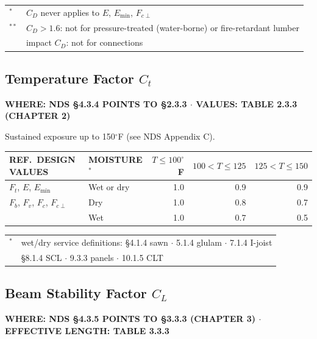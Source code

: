 \documentclass[10pt]{article}
\begin{document}
\smallskip
{\ttfamily\footnotesize
\begin{tabular}{@{}ll@{}}
$^{*}$  & $C_D$ never applies to $E$, $E_{\min}$, $F_{c\perp}$ \\
$^{**}$ & $C_D > 1.6$: not for pressure-treated (water-borne) or fire-retardant lumber \\
        & impact $C_D$: not for connections \\
\end{tabular}}

\subsection{Temperature Factor $C_t$}

{\ttfamily\footnotesize\bfseries WHERE: NDS \S 4.3.4 POINTS TO \S 2.3.3 $\cdot$ VALUES: TABLE 2.3.3 (CHAPTER 2)}

\medskip
Sustained exposure up to 150$^\circ$F (see NDS Appendix C).

\medskip
{\setlength{\arrayrulewidth}{0.5pt}\ttfamily\footnotesize
\begin{tabular}{@{}llrrr@{}}
\hline
{\scriptsize REF.\ DESIGN VALUES} & {\scriptsize MOISTURE$^{*}$} & {\scriptsize $T\le100^\circ$F} & {\scriptsize $100<T\le125$} & {\scriptsize $125<T\le150$} \\
\hline
$F_t$, $E$, $E_{\min}$ & Wet or dry & 1.0 & 0.9 & 0.9 \\
$F_b$, $F_v$, $F_c$, $F_{c\perp}$ & Dry & 1.0 & 0.8 & 0.7 \\
                                  & Wet & 1.0 & 0.7 & 0.5 \\
\hline
\end{tabular}}

\smallskip
{\ttfamily\footnotesize
\begin{tabular}{@{}ll@{}}
$^{*}$ & wet/dry service definitions: \S 4.1.4 sawn $\cdot$ 5.1.4 glulam $\cdot$ 7.1.4 I-joist \\
       & \S 8.1.4 SCL $\cdot$ 9.3.3 panels $\cdot$ 10.1.5 CLT \\
\end{tabular}}

\subsection{Beam Stability Factor $C_L$}

{\ttfamily\footnotesize\bfseries WHERE: NDS \S 4.3.5 POINTS TO \S 3.3.3 (CHAPTER 3) $\cdot$ EFFECTIVE LENGTH: TABLE 3.3.3}
\end{document}
